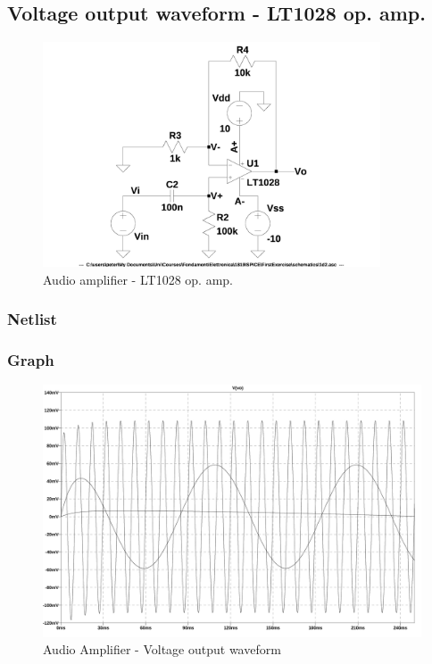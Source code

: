 \documentclass[10pt,a4paper]{article}
\begin{document}
\subsection{Voltage output waveform - LT1028 op. amp.}
\begin{figure}[h]
  \centering
  \includegraphics[width=10cm]{schematics/1d2.jpg}
  \caption{Audio amplifier - LT1028 op. amp.}
  \label{1d2schematics}
\end{figure}

\subsubsection{Netlist}


\subsubsection{Graph}
\begin{figure}[H]
  \centering
  \includegraphics[width=14cm]{graph/1d2.jpg}
  \caption{Audio Amplifier - Voltage output waveform}
  \label{1d2graph}
\end{figure}
\end{document}
